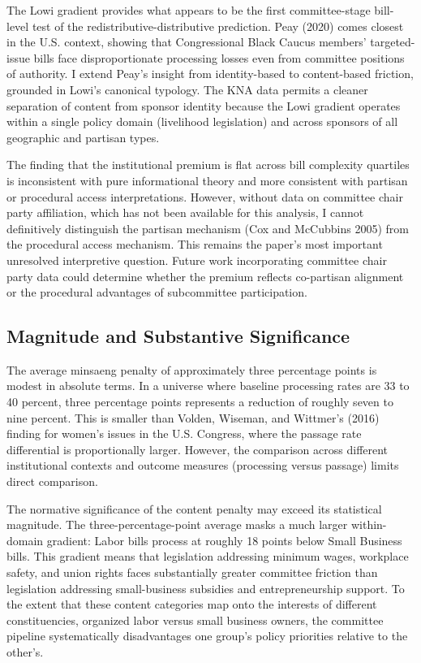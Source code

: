 \documentclass[11pt]{article}
\begin{document}
The Lowi gradient provides what appears to be the first committee-stage bill-level test of the redistributive-distributive prediction. Peay (2020) comes closest in the U.S. context, showing that Congressional Black Caucus members' targeted-issue bills face disproportionate processing losses even from committee positions of authority. I extend Peay's insight from identity-based to content-based friction, grounded in Lowi's canonical typology. The KNA data permits a cleaner separation of content from sponsor identity because the Lowi gradient operates within a single policy domain (livelihood legislation) and across sponsors of all geographic and partisan types.

The finding that the institutional premium is flat across bill complexity quartiles is inconsistent with pure informational theory and more consistent with partisan or procedural access interpretations. However, without data on committee chair party affiliation, which has not been available for this analysis, I cannot definitively distinguish the partisan mechanism (Cox and McCubbins 2005) from the procedural access mechanism. This remains the paper's most important unresolved interpretive question. Future work incorporating committee chair party data could determine whether the premium reflects co-partisan alignment or the procedural advantages of subcommittee participation.

\subsection{Magnitude and Substantive Significance}

The average minsaeng penalty of approximately three percentage points is modest in absolute terms. In a universe where baseline processing rates are 33 to 40 percent, three percentage points represents a reduction of roughly seven to nine percent. This is smaller than Volden, Wiseman, and Wittmer's (2016) finding for women's issues in the U.S. Congress, where the passage rate differential is proportionally larger. However, the comparison across different institutional contexts and outcome measures (processing versus passage) limits direct comparison.

The normative significance of the content penalty may exceed its statistical magnitude. The three-percentage-point average masks a much larger within-domain gradient: Labor bills process at roughly 18 points below Small Business bills. This gradient means that legislation addressing minimum wages, workplace safety, and union rights faces substantially greater committee friction than legislation addressing small-business subsidies and entrepreneurship support. To the extent that these content categories map onto the interests of different constituencies, organized labor versus small business owners, the committee pipeline systematically disadvantages one group's policy priorities relative to the other's.
\end{document}

